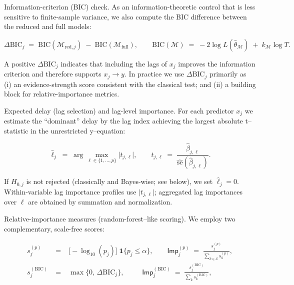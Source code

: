 \documentclass[preprint, 3p,
authoryear]{elsarticle} %
\begin{document}
Information-criterion (BIC) check. As an information-theoretic control
that is less sensitive to finite-sample variance, we also compute the
BIC difference between the reduced and full models:

\begin{equation}
\Delta\mathrm{BIC}_j \;=\; \mathrm{BIC}(\mathcal{M}_{\text{red},j}) \;-\; \mathrm{BIC}(\mathcal{M}_{\text{full}}),
\qquad
\mathrm{BIC}(\mathcal{M}) \;=\; -2\log L(\widehat{\theta}_{\mathcal{M}})\;+\; k_{\mathcal{M}}\log T.
\label{eq:dbic}
\end{equation}

A positive \(\Delta\mathrm{BIC}_j\) indicates that including the lags of
\(x_j\) improves the information criterion and therefore supports
\(x_j \to y\). In practice we use \(\Delta\mathrm{BIC}_j\) primarily as
(i) an evidence-strength score consistent with the classical test; and
(ii) a building block for relative-importance metrics.

Expected delay (lag selection) and lag-level importance. For each
predictor \(x_j\) we estimate the ``dominant'' delay by the lag index
achieving the largest absolute t--statistic in the unrestricted
y--equation:

\begin{equation}
\widehat{\ell}_j \;=\; \arg\max_{\ell\in\{1,\dots,p\}} \big|t_{j,\ell}\big|,
\qquad
t_{j,\ell} \;=\; \frac{\widehat{\beta}_{j,\ell}}{\widehat{\mathrm{se}}(\widehat{\beta}_{j,\ell})}.
\label{eq:expLag}
\end{equation}

If \(H_{0,j}\) is not rejected (classically and Bayes-wise; see below),
we set \(\widehat{\ell}_j=0\). Within-variable lag importance profiles
use \(\big|t_{j,\ell}\big|\); aggregated lag importances over \(\ell\)
are obtained by summation and normalization.

Relative-importance measures (random-forest--like scoring). We employ
two complementary, scale-free scores:

\begin{eqnarray}
s^{(p)}_j \;&=&\; \big[-\log_{10}(p_j)\big]\;\mathbf{1}\{p_j\le \alpha\},
\qquad
\mathsf{Imp}^{(p)}_j \;=\; \frac{s^{(p)}_j}{\sum_{k\in\mathcal{S}} s^{(p)}_k},
\label{eq:impP}\\
s^{(\mathrm{BIC})}_j \;&=&\; \max\big\{0,\,\Delta\mathrm{BIC}_j\big\},
\qquad\;\;
\mathsf{Imp}^{(\mathrm{BIC})}_j \;=\; \frac{s^{(\mathrm{BIC})}_j}{\sum_{k} s^{(\mathrm{BIC})}_k},
\label{eq:impBIC}
\end{eqnarray}
\end{document}

